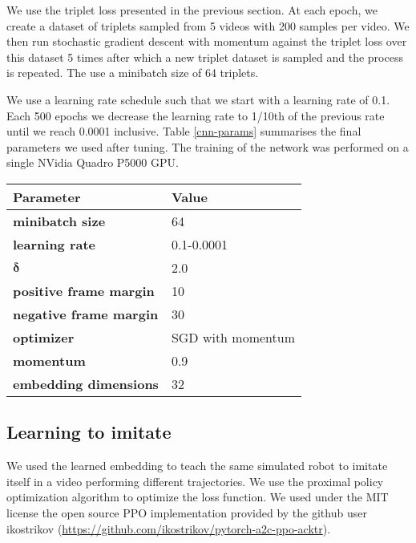 We use the triplet loss presented in the previous section. At each epoch, we create a dataset of triplets sampled from 5 videos with 200 samples per video. We then run stochastic gradient descent with momentum against the triplet loss over this dataset 5 times after which a new triplet dataset is sampled and the process is repeated. The use a minibatch size of 64 triplets.

We use a learning rate schedule such that we start with a learning rate of 0.1. Each 500 epochs we decrease the learning rate to 1/10th of the previous rate until we reach 0.0001 inclusive. Table \ref{cnn-params} summarises the final parameters we used after tuning. The training of the network was performed on a single NVidia Quadro P5000 GPU.

{
    \vspace{0.5cm}
    \centering
    \begin{tabular}{@{}ll@{}}
    \toprule
    \textbf{Parameter}             & \textbf{Value}    \\ \midrule
    \textbf{minibatch size}        & 64                \\
    \textbf{learning rate}         & 0.1-0.0001        \\
    $\boldsymbol{\delta}$                & 2.0               \\
    \textbf{positive frame margin} & 10                \\
    \textbf{negative frame margin} & 30                \\
    \textbf{optimizer}             & SGD with momentum \\
    \textbf{momentum}              & 0.9               \\
    \textbf{embedding dimensions}  & 32
    \end{tabular}
    \label{cnn-params}
}

\subsection{Learning to imitate}

We used the learned embedding to teach the same simulated robot to imitate itself in a video performing different trajectories. We use the proximal policy optimization algorithm to optimize the loss function. We used under the MIT license the open source PPO implementation provided by the github user ikostrikov (\url{https://github.com/ikostrikov/pytorch-a2c-ppo-acktr}).

